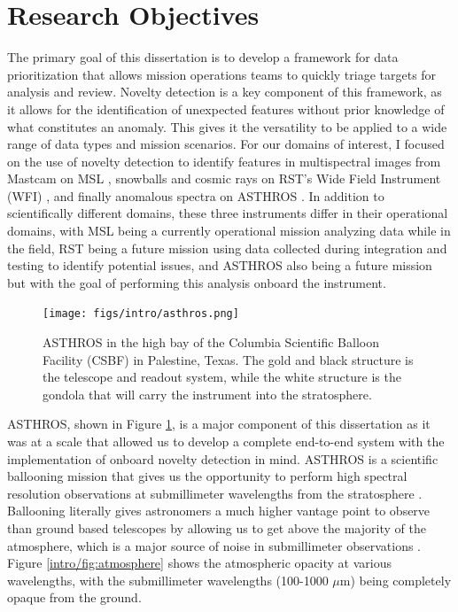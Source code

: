 \section{Research Objectives}
The primary goal of this dissertation is to develop a framework for data prioritization that allows mission operations teams to quickly triage targets for analysis and review.
Novelty detection is a key component of this framework, as it allows for the identification of unexpected features without prior knowledge of what constitutes an anomaly.
This gives it the versatility to be applied to a wide range of data types and mission scenarios.
For our domains of interest, I focused on the use of novelty detection to identify features in multispectral images from Mastcam on MSL \cite{horton2021integrating}, snowballs and cosmic rays on RST's Wide Field Instrument (WFI) \cite{horton2024anomaly}, and finally anomalous spectra on ASTHROS \cite{horton2024onboard}.
In addition to scientifically different domains, these three instruments differ in their operational domains, with MSL being a currently operational mission analyzing data while in the field, RST being a future mission using data collected during integration and testing to identify potential issues, and ASTHROS also being a future mission but with the goal of performing this analysis onboard the instrument.

\begin{figure}
\centering
\texttt{[image: figs/intro/asthros.png]}
\caption[The Astrophysics Stratospheric Telescope for High Spectral Resolution Observations at Submillimeter-wavelengths (ASTHROS)]{
    ASTHROS in the high bay of the Columbia Scientific Balloon Facility (CSBF) in Palestine, Texas. 
    The gold and black structure is the telescope and readout system, while the white structure is the gondola that will carry the instrument into the stratosphere. 
}
\label{intro/fig:asthros}
\end{figure}

ASTHROS, shown in Figure \ref{intro/fig:asthros}, is a major component of this dissertation as it was at a scale that allowed us to develop a complete end-to-end system with the implementation of onboard novelty detection in mind. 
ASTHROS is a scientific ballooning mission that gives us the opportunity to perform high spectral resolution observations at submillimeter wavelengths from the stratosphere \parencite{siles2020asthros}.
Ballooning literally gives astronomers a much higher vantage point to observe than ground based telescopes by allowing us to get above the majority of the atmosphere, which is a major source of noise in submillimeter observations \cite{yajima2009scientific}.
Figure \ref{intro/fig:atmosphere} shows the atmospheric opacity at various wavelengths, with the submillimeter wavelengths (100-1000 $\mu$m) being completely opaque from the ground.

